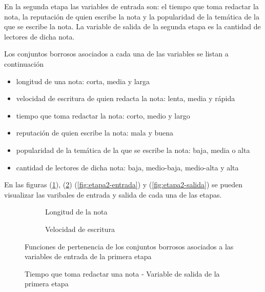 \documentclass{article}
\begin{document}
\vspace{3mm}
En la segunda etapa las variables de entrada son: el tiempo que toma redactar la nota, la reputación de quien escribe la nota y la popularidad de la temática de la que se escribe la nota. La variable de salida de la segunda etapa es la cantidad de lectores de dicha nota.

\vspace{3mm}
Los conjuntos borrosos asociados a cada una de las variables se listan a continuación

\begin{itemize}
	\setlength\itemsep{0.001em} %
	\item longitud de una nota: corta, media y larga
	\item velocidad de escritura de quien redacta la nota: lenta, media y rápida
	\item tiempo que toma redactar la nota: corto, medio y largo
	\item reputación de quien escribe la nota: mala y buena
	\item popularidad de la temática de la que se escribe la nota: baja, media o alta
	\item cantidad de lectores de dicha nota: baja, medio-baja, medio-alta y alta
\end{itemize}

En las figuras (\ref{fig:etapa1-entrada}), (\ref{fig:etapa1-salida}) (\ref{fig:etapa2-entrada}) y (\ref{fig:etapa2-salida}) se pueden visualizar las varibales de entrada y salida de cada una de las etapas.

\begin{figure}[H]
	\centering
	\begin{subfigure}[b]{0.4\textwidth}
		\centering
		\caption{Longitud de la nota}
	\end{subfigure}
	\qquad
	\begin{subfigure}[b]{0.4\textwidth}
		\centering
		\caption{Velocidad de escritura}
	\end{subfigure}
	\caption{Funciones de pertenencia de los conjuntos borrosos asociados a las variables de entrada de la primera etapa}
	\label{fig:etapa1-entrada}
\end{figure}

\begin{figure}[H]
	\centering
	\caption{Tiempo que toma redactar una nota - Variable de salida de la primera etapa}
	\label{fig:etapa1-salida}
\end{figure}
\end{document}
